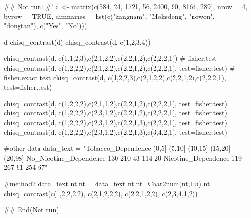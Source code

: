 \documentclass[a4paper]{book}
\begin{document}
\begin{Examples}
\begin{ExampleCode}

\#\# Not run: 
#'
d <- matrix(c(584, 24, 1721, 56, 2400, 90, 8164, 289),
            nrow = 4, byrow = TRUE,
            dimnames = list(c("kangnam", "Moksdong", "nowon", "dongtan"), c("Yes", "No")))

d%
chisq_contrast(d)
chisq_contrast(d, c(1,2,3,4))


chisq_contrast(d, c(1,1,2,3),c(2,1,2,2),c(2,2,1,2),c(2,2,2,1))
# fisher.test
chisq_contrast(d, c(1,2,2,2),c(2,1,2,2),c(2,2,1,2),c(2,2,2,1), test=fisher.test)
# fisher.exact test
chisq_contrast(d, c(1,2,2,3),c(2,1,2,2),c(2,2,1,2),c(2,2,2,1), test=fisher.test)

chisq_contrast(d, c(1,2,2,2),c(2,1,1,2),c(2,2,1,2),c(2,2,2,1), test=fisher.test)
chisq_contrast(d, c(1,2,2,2),c(2,3,1,2),c(2,2,1,2),c(2,2,2,1), test=fisher.test)
chisq_contrast(d, c(1,2,2,2),c(2,3,1,2),c(2,2,1,3),c(2,2,2,1), test=fisher.test)
chisq_contrast(d, c(1,2,2,2),c(2,3,1,2),c(2,2,1,3),c(3,4,2,1), test=fisher.test)


#other data
data_text = "Tobacco_Dependence (0,5] (5,10] (10,15] (15,20] (20,98]
No_Nicotine_Dependence 130 210 43 114 20
Nicotine_Dependence 119 267 91 254 67"

#method2
data_text%
nt
nt = data_text%
nt %
nt=Char2num(nt,1:5)
nt%
  chisq_contrast(c(1,2,2,2,2),
                 c(2,1,2,2,2),
                 c(2,2,1,2,2),
                 c(2,3,4,1,2))

## End(Not run)


\end{ExampleCode}
\end{Examples}
\end{document}
